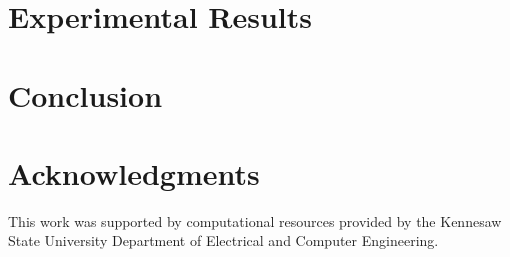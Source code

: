 \documentclass[11pt,a4paper]{article}
\begin{document}
\section{Experimental Results}

\section{Conclusion}

\section*{Acknowledgments}
This work was supported by computational resources provided by the Kennesaw
State University Department of Electrical and Computer Engineering.



\end{document}
